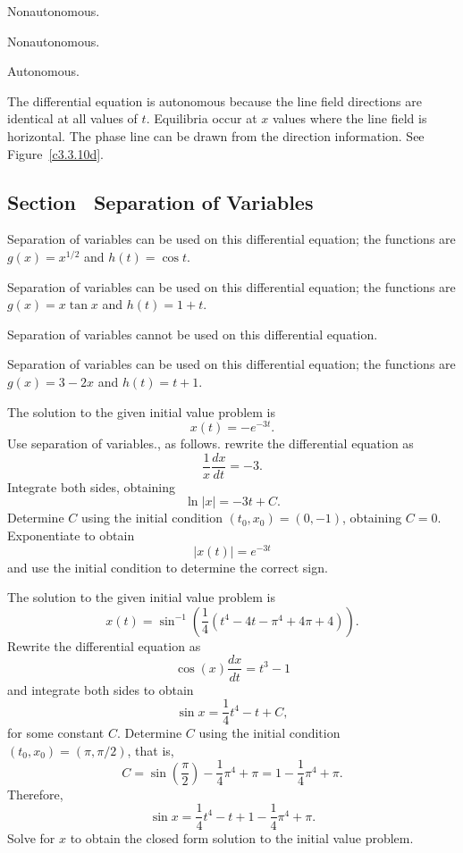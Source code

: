 \begin{figure}[ht]
     \centerline{%
     }
\end{figure} 

 Nonautonomous.

 Nonautonomous.

 \ans Autonomous.

\soln  The differential equation is autonomous because the line field 
directions are identical at all values of $t$.  Equilibria occur at
$x$ values where the line field is horizontal.  The phase line can be
drawn from the direction information.  See Figure~\ref{c3.3.10d}.

\begin{figure}[ht]
     \centerline{%
     }
\end{figure}



\newpage
\subsection*{Section~\protect{\ref{sec:sov}} Separation of Variables}

 \ans Separation of variables can be used on this differential
equation; the functions are $g(x) = x^{1/2}$ and $h(t) = \cos t$.

 \ans Separation of variables can be used on this differential
equation; the functions are $g(x) = x\tan x$ and $h(t) = 1 + t$.

 \ans Separation of variables cannot be used on this
differential equation.

 \ans Separation of variables can be used on this differential
equation; the functions are $g(x) = 3 - 2x$ and $h(t) = t + 1$.

 \ans The solution to the given initial value problem is
\[
x(t) = -e^{-3t}.
\]
\soln Use separation of variables., as follows.  rewrite the differential 
equation as
\[
\frac{1}{x}\frac{dx}{dt} = -3.
\]
Integrate both sides, obtaining 
\[
\ln|x| = -3t + C.
\]
Determine $C$ using the initial condition $(t_0,x_0)=(0,-1)$, obtaining
$C=0$.  Exponentiate to obtain 
\[
|x(t)| = e^{-3t}
\]
and use the initial condition to determine the correct sign.

 \ans The solution to the given initial value problem is
\[
x(t) = \sin^{-1}\left(\frac{1}{4}(t^4 - 4t - \pi^4 + 4\pi + 4)\right).
\]
\soln Rewrite the differential equation as
\[
\cos(x) \frac{dx}{dt} = t^3 - 1
\]
and integrate both sides to obtain
\[
\sin x = \frac{1}{4}t^4 - t + C,
\]
for some constant $C$.  Determine $C$ using the initial condition 
$(t_0,x_0)=(\pi,\pi/2)$, that is,
\[
C = \sin\left(\frac{\pi}{2}\right) - \frac{1}{4}\pi^4 + \pi 
= 1 - \frac{1}{4}\pi^4 + \pi.
\]
Therefore,
\[
\sin x = \frac{1}{4}t^4 - t + 1 - \frac{1}{4}\pi^4 + \pi.
\]
Solve for $x$ to obtain the closed form solution to the initial value problem.


